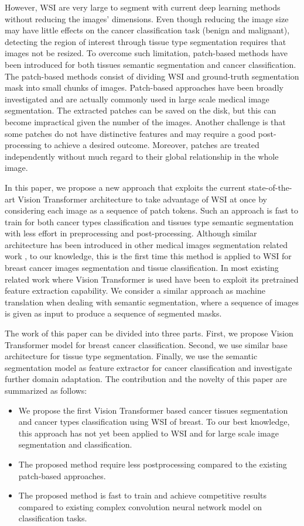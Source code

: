 \documentclass[review]{cvpr}
\begin{document}
However, WSI are very large to segment with current deep learning methods without reducing the images' dimensions. Even though reducing the image size may have little effects on the cancer classification task (benign and malignant), detecting the region of interest through tissue type segmentation requires that images not be resized. To overcome such limitation, patch-based methods have been introduced\cite{7780635} for both tissues semantic segmentation and cancer classification. The patch-based methods consist of dividing WSI and ground-truth segmentation mask into small chunks of images. Patch-based approaches have been broadly investigated\cite{8451551} and are actually commonly used in large scale medical image segmentation. The extracted patches can be saved on the disk, but this can become impractical given the number of the images. Another challenge is that some patches do not have distinctive features and may require a good post-processing to achieve a desired outcome. Moreover, patches are treated independently without much regard to their global relationship in the whole image.

In this paper, we propose a new approach that exploits the current state-of-the-art Vision Transformer architecture to take advantage of WSI at once by considering each image as a sequence of patch tokens. Such an approach is fast to train for both cancer types classification and tissues type semantic segmentation with less effort in preprocessing and post-processing. Although similar architecture has been introduced in other medical images segmentation related work \cite{chen2021transunet}, to our knowledge, this is the first time this method is applied to WSI for breast cancer images segmentation and tissue classification. In most existing related work where Vision Transformer is used have been to exploit its pretrained feature extraction capability. We consider a similar approach as machine translation when dealing with semantic segmentation, where a sequence of images is given as input to produce a sequence of segmented masks.

The work of this paper can be divided into three parts. First, we propose Vision Transformer model for breast cancer classification. Second, we use similar base architecture for tissue type segmentation. Finally, we use the semantic segmentation model as feature extractor for cancer classification and investigate further domain adaptation. The contribution and the novelty of this paper are summarized as follows:
\begin{itemize}
    \item We propose the first Vision Transformer based cancer tissues segmentation and cancer types classification using WSI of breast. To our best knowledge, this approach has not yet been applied to WSI  and for large scale image segmentation and classification. 
    \item The proposed method require less postprocessing compared to the existing patch-based approaches.
    \item The proposed method is fast to train and achieve competitive results compared to existing complex convolution neural network model on classification tasks.
\end{itemize}
\end{document}
